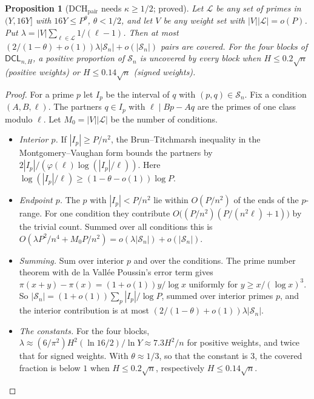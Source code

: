 \documentclass[11pt]{amsart}
\newtheorem{proposition}[theorem]{Proposition}
\theoremstyle{definition}
\newcommand{\Sn}{\mathcal{S}_n}
\newcommand{\DCL}{\textsf{DCL}}
\begin{document}
\begin{proposition}[$\mathrm{DCH}_{\mathrm{pair}}$ needs $\kappa\ge1/2$; proved]\label{prop:N}
Let $\mathcal L$ be any set of primes in $(Y,16Y]$ with $16Y\le P^\theta$, $\theta<1/2$, and let
$V$ be any weight set with $|V||\mathcal L|=o(P)$. Put $\lambda=|V|\sum_{\ell\in\mathcal
L}1/(\ell-1)$. Then at most $(2/(1-\theta)+o(1))\lambda|\Sn|+o(|\Sn|)$ pairs are covered. For
the four blocks of $\DCL_{n,H}$, a positive proportion of $\Sn$ is uncovered by every block when
$H\le0.2\sqrt n$ (positive weights) or $H\le0.14\sqrt n$ (signed weights).
\end{proposition}
\begin{proof}
For a prime $p$ let $I_p$ be the interval of $q$ with $(p,q)\in\Sn$. Fix a condition
$(A,B,\ell)$. The partners $q\in I_p$ with $\ell\mid Bp-Aq$ are the primes of one class modulo
$\ell$. Let $M_0=|V||\mathcal L|$ be the number of conditions.
\begin{itemize}
\item \emph{Interior $p$.} If $|I_p|\ge P/n^2$, the Brun--Titchmarsh inequality in the
  Montgomery--Vaughan form \cite{mv1973} bounds the partners by
  $2|I_p|/(\varphi(\ell)\log(|I_p|/\ell))$. Here $\log(|I_p|/\ell)\ge(1-\theta-o(1))\log P$.
\item \emph{Endpoint $p$.} The $p$ with $|I_p|<P/n^2$ lie within $O(P/n^2)$ of the ends of the
  $p$-range. For one condition they contribute $O\bigl((P/n^2)(P/(n^2\ell)+1)\bigr)$ by the
  trivial count. Summed over all conditions this is $O(\lambda P^2/n^4+M_0P/n^2)=o(\lambda|\Sn|)
  +o(|\Sn|)$.
\item \emph{Summing.} Sum over interior $p$ and over the conditions. The prime number theorem
  with de la Vall\'ee Poussin's error term gives
  $\pi(x+y)-\pi(x)=(1+o(1))y/\log x$ uniformly for $y\ge x/(\log x)^{3}$. So
  $|\Sn|=(1+o(1))\sum_p|I_p|/\log P$, summed over interior primes $p$, and the interior
  contribution is at most $(2/(1-\theta)+o(1))\lambda|\Sn|$.
\item \emph{The constants.} For the four blocks, $\lambda\approx(6/\pi^2)H^2(\ln16/2)/\ln
  Y\approx7.3H^2/n$ for positive weights, and twice that for signed weights. With $\theta\approx
  1/3$, so that the constant is $3$, the covered fraction is below $1$ when $H\le0.2\sqrt n$,
  respectively $H\le0.14\sqrt n$.
\end{itemize}
\end{proof}
\end{document}
